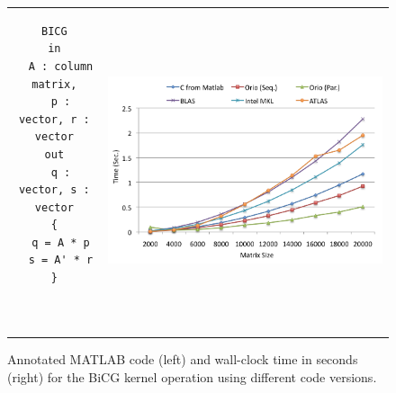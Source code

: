 \documentclass[11pt]{article}
\begin{document}
\begin{figure}[htp]
\centering
\begin{tabular}{cc}
\begin{minipage}[b]{.3\textwidth}
\footnotesize
\begin{verbatim}
BICG
in
  A : column matrix,
  p : vector, r : vector
out
  q : vector, s : vector
{
  q = A * p
  s = A' * r
}



\end{verbatim}
\end{minipage}
&
\begin{minipage}[b]{.6\textwidth}
\includegraphics[width=\textwidth]{figures/bicgkernel.png}
\end{minipage}\\
\end{tabular}
\caption{Annotated MATLAB code (left) and wall-clock time in seconds (right) for the BiCG kernel operation using different code versions.}
\label{fig:bicgkernel}
\end{figure}




\end{document}
